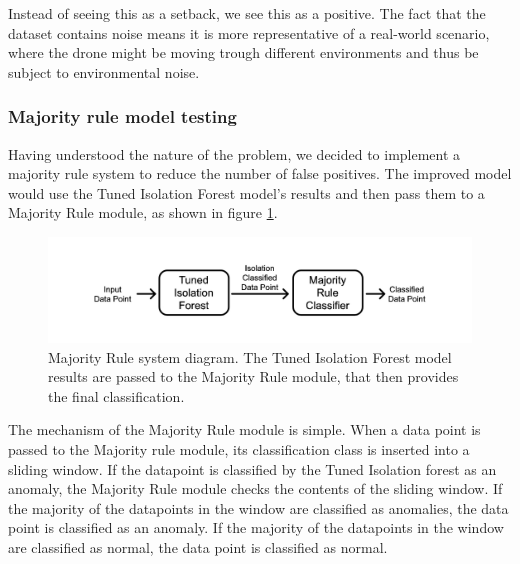 \documentclass[futureinternet,article,submit,pdftex,moreauthors]{Definitions/mdpi}
\begin{document}
Instead of seeing this as a setback, we see this as a positive. The fact that the dataset contains noise means it is more representative of a real-world scenario, where the drone might be moving trough different environments and thus be subject to environmental noise.

\subsubsection{Majority rule model testing} \label{sec:majorityRuleModelTesting}

Having understood the nature of the problem, we decided to implement a majority rule system to reduce the number of false positives. The improved model would use the Tuned Isolation Forest model's results and then pass them to a Majority Rule module, as shown in figure \ref{fig:MajorityRuleDiagram}. 

\begin{figure}[H]
	\includegraphics[width=12.5 cm]{img/ModulesStructure.jpg}
	\caption{Majority Rule system diagram. The Tuned Isolation Forest model results are passed to the Majority Rule module, that then provides the final classification.}
	\label{fig:MajorityRuleDiagram}
	\end{figure}   
\unskip

The mechanism of the Majority Rule module is simple. When a data point is passed to the Majority rule module, its classification class is inserted into a sliding window. If the datapoint is classified by the Tuned Isolation forest as an anomaly, the Majority Rule module checks the contents of the sliding window. If the 
majority of the datapoints in the window are classified as anomalies, the data point is classified as an anomaly. If the majority of the datapoints in the window are classified as normal, the data point is classified as normal.
\end{document}
